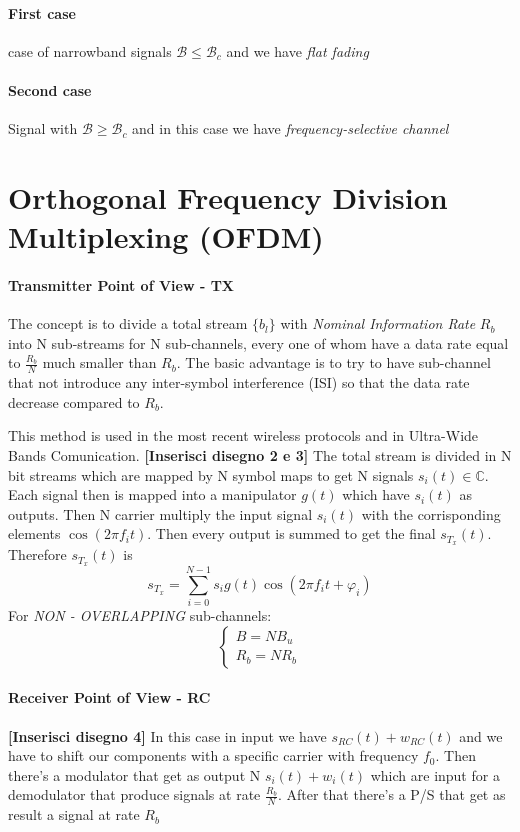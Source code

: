 \paragraph{First case} case of narrowband signals $\mathcal{B} \leq \mathcal{B}_c$ and we have \textit{flat fading}
\paragraph{Second case} Signal with $\mathcal{B} \geq \mathcal{B}_c$
and in this case we have \textit{frequency-selective channel}

\section{Orthogonal Frequency Division Multiplexing (OFDM)}
\paragraph{Transmitter Point of View - TX}
The concept is to divide a total stream $\{b_l\}$ with \textit{Nominal Information Rate} $R_b$ into N sub-streams for N sub-channels, every one of whom have a data rate equal to $\frac{R_b}{N}$ much smaller than $R_b$.
The basic advantage is to try to have sub-channel that not introduce any inter-symbol interference (ISI) so that the data rate decrease compared to $R_b$. 

This method is used in the most recent wireless protocols and in Ultra-Wide Bands Comunication. 
\textbf{[Inserisci disegno 2 e 3]}
The total stream is divided in N bit streams which are mapped by N symbol maps to get N signals $s_i(t) \in \mathbb{C}$. Each signal then is mapped into a manipulator $g(t)$ which have $s_i(t)$ as outputs. Then N carrier multiply the input signal $s_i(t)$ with the corrisponding elements $\cos(2\pi f_i t)$. Then every output is summed to get the final $s_{T_x}(t)$. 
Therefore $s_{T_x}(t)$ is
\begin{equation}
s_{T_x} = \sum\limits_{i=0}^{N-1} s_i g(t) \cos(2\pi f_i t + \varphi_i)
\end{equation}
For \emph{NON - OVERLAPPING} sub-channels:
\begin{equation}
\begin{cases}
B = N B_u\\
R_b = N R_b
\end{cases}
\end{equation}

\paragraph{Receiver Point of View - RC}
\textbf{[Inserisci disegno 4]}
In this case in input we have $s_{RC}(t) + w_{RC}(t)$ and we have to shift our components with a specific carrier with frequency $f_0$. Then there's a modulator that get as output N $s_i(t) + w_i(t)$ which are input for a demodulator that produce signals at rate $\frac{R_b}{N}$. After that there's a P/S that get as result a signal at rate $R_b$ 

